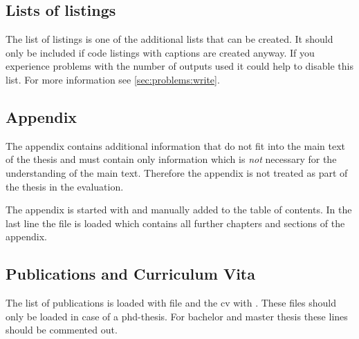 \subsection{Lists of listings}
\label{sec:document:listings}

The list of listings is one of the additional lists that can be created. 
It should only be included if code listings with captions are created anyway.
If you experience problems with the number of  outputs used it could
help to disable this list.
For more information see \cref{sec:problems:write}.


\subsection{Appendix}
\label{sec:document:appendix}

The appendix contains additional information that do not fit into the main text of the thesis and must contain only information which is \emph{not} necessary for the understanding of the main text. Therefore the appendix is not treated as part of the thesis in the evaluation.

The appendix is started with  and manually added to the table of contents. In the last line the file  is loaded which contains all further chapters and sections of the appendix.
%

\subsection{Publications and Curriculum Vita}
\label{sec:document:cv}

The list of publications is loaded with file  and the cv with . These files should only be loaded in case of a phd-thesis. For bachelor and master thesis these lines should be commented out.
%


